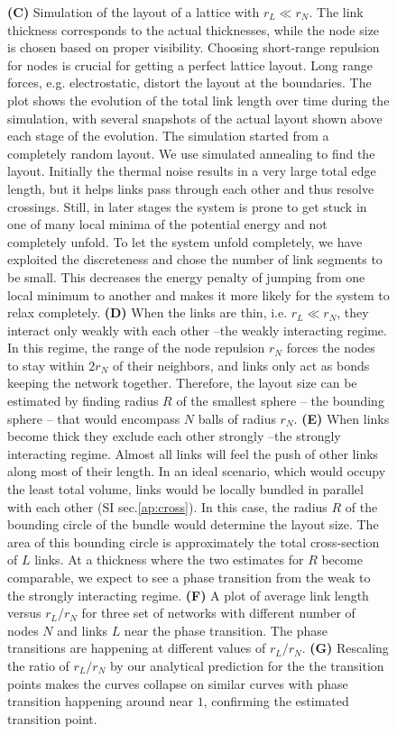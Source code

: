 \documentclass[nofootinbib,preprint,floatfix,titlepage,endfloats,superscriptaddress]{revtex4} %
\begin{document}
\begin{figure}
{    {\bf (C)} Simulation of the layout of a lattice with $r_L\ll r_N$. The link thickness corresponds to the actual thicknesses, while the node size is chosen based on proper visibility. Choosing short-range repulsion for nodes is crucial for getting a perfect lattice layout. Long range forces, e.g. electrostatic,  distort the layout at the boundaries. The plot shows the evolution of the total link length over time during the simulation, with several snapshots of the actual layout shown above each stage of the evolution. 
    The simulation started from a completely random layout. 
    We use simulated annealing to find the layout.
    Initially the thermal noise results in a very large total edge length, but it helps links pass through each other and thus resolve crossings.
    Still, in later stages the system is prone to get stuck in one of many local minima of the potential energy and not completely unfold. 
    To let the system unfold completely, we have exploited the discreteness and chose the number of link segments to be small. 
    This decreases the energy penalty of jumping from one local minimum to another and makes it more likely for the system to relax completely.
    {\bf (D)} When the links are thin, i.e. $r_L\ll r_N$, they interact only weakly with each other --the weakly interacting regime. 
    In this regime, the range of the node repulsion $r_N$ forces the nodes to stay within $2r_N$ of their neighbors, and links only act as bonds keeping the network together.
    Therefore, the layout size can be estimated by finding radius $R$ of the smallest sphere -- the bounding sphere -- that would encompass $N$ balls of radius $r_N$. 
    {\bf (E)} When links become thick they exclude each other strongly --the strongly interacting regime. 
    Almost all links will feel the push of other links along most of their length. 
    In an ideal scenario, which would occupy the least total volume, links would be locally bundled in parallel with each other (SI sec.\ref{ap:cross}). 
    In this case, the radius $R$ of the bounding circle of the bundle would determine the layout size.
    The area of this bounding circle is approximately the total cross-section of $L$ links. 
    At a thickness where the two estimates for $R$ become comparable, we expect to see a phase transition from the weak to the strongly interacting regime. 
    {\bf (F)} A plot of average link length versus $r_L/r_N$ for three set of networks with different number of nodes $N$ and links $L$ near the phase transition. The phase transitions are happening at different values of $r_L/r_N$. 
    {\bf (G)} Rescaling the ratio of $r_L/r_N$ by our analytical prediction for the the transition points makes the curves collapse on similar curves with phase transition happening around near $1$, confirming the estimated transition point. }
    \label{fig:trans}
    \label{fig:crs-lat}
\end{figure}
\end{document}
